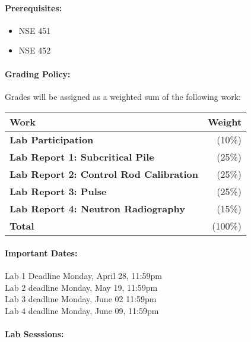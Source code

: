 \documentclass[11pt, a4paper]{article}
\begin{document}
\paragraph{Prerequisites:}
\begin{itemize}
\item NSE 451
\item NSE 452
\end{itemize}

\paragraph{Grading Policy:} Grades will be assigned as a weighted sum of the following work:

\begin{table}[h]
\begin{tabularx}{\textwidth}{Xr}
\textbf{Work} & \textbf{Weight}\\
\hline
\textbf{Lab Participation} & (10\%) \\
\textbf{Lab Report 1: Subcritical Pile} & (25\%) \\
\textbf{Lab Report 2: Control Rod Calibration} & (25\%) \\
\textbf{Lab Report 3: Pulse} & (25\%) \\
\textbf{Lab Report 4: Neutron Radiography} & (15\%) \\
\hline
\textbf{Total} & (100\%) \\
\end{tabularx}
\end{table}

\paragraph{Important Dates:}
\begin{center} \begin{minipage}{3.8in}
\begin{flushleft}
Lab 1 Deadline      \dotfill Monday, April 28, 11:59pm  \\
Lab 2 deadline      \dotfill Monday, May 19, 11:59pm  \\
Lab 3 deadline      \dotfill Monday, June 02 11:59pm  \\
Lab 4 deadline      \dotfill Monday, June 09, 11:59pm  \\
\end{flushleft}
\end{minipage}
\end{center}

\paragraph{Lab Sesssions:}
\end{document}
